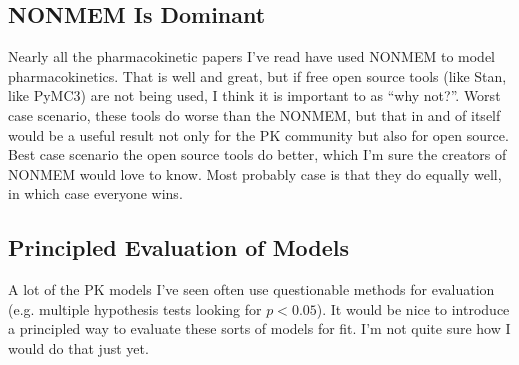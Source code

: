 \documentclass[12pt,a4paper]{book}
\begin{document}
\subsection{NONMEM Is Dominant}

Nearly all the pharmacokinetic papers I've read have used NONMEM to model pharmacokinetics.  That is well and great, but if free open source tools (like Stan, like PyMC3) are not being used, I think it is important to as ``why not?''.  Worst case scenario, these tools do worse than the NONMEM, but that in and of itself would be a useful result not only for the PK community but also for open source.  Best case scenario the open source tools do better, which I'm sure the creators of NONMEM would love to know.  Most probably case is that they do equally well, in which case everyone wins.

\subsection{Principled Evaluation of Models}
 
 A lot of the PK models I've seen often use questionable methods for evaluation (e.g. multiple hypothesis tests looking for $ p<0.05 $). It would be nice to introduce a principled way to evaluate these sorts of models for fit.  I'm not quite sure how I would do that just yet.
\end{document}
